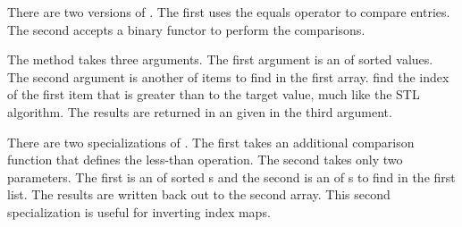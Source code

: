 \begin{description}
  There are two versions of . The first uses the equals
  operator to compare entries. The second accepts a binary functor to
  perform the comparisons.
\item[\textcode{UpperBounds}]  The
   method takes three arguments. The first argument
  is an  of sorted values. The second argument
  is another  of items to find in the first
  array.  find the index of the first item that is
  greater than to the target value, much like the
   STL algorithm. The results are returned in
  an  given in the third argument.

  There are two specializations of . The first takes
  an additional comparison function that defines the less-than
  operation. The second takes only two parameters. The first is an
   of sorted s and the second is an
   of s to find in the first list. The
  results are written back out to the second array. This second
  specialization is useful for inverting index maps.
\end{description}






